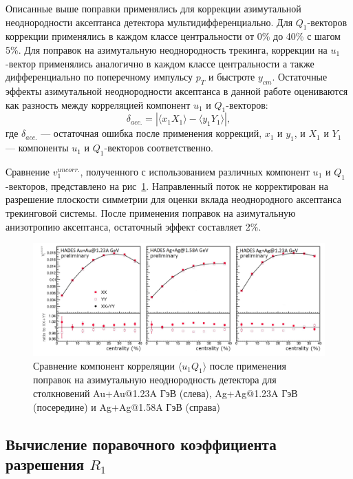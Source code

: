 Описанные выше поправки применялись для коррекции азимутальной неоднородности аксептанса детектора мультидифференциально.
Для $Q_1$-векторов коррекции применялись в каждом классе центральности от 0\% до 40\% с шагом 5\%.
Для поправок на азимутальную неоднородность трекинга, коррекции на $u_1$-вектор применялись аналогично в каждом классе центральности а также дифференциально по поперечному импульсу $p_T$ и быстроте $y_{cm}$. 
Остаточные эффекты азимутальной неоднородности аксептанса в данной работе оцениваются как разность между корреляцией компонент $u_1$ и $Q_1$-векторов:
\begin{equation}
    \delta_{acc.} = | \langle x_1 X_1 \rangle - \langle y_1 Y_1 \rangle |,
\end{equation}
где $\delta_{acc.}$ --- остаточная ошибка после применения коррекций, $x_1$ и $y_1$, и $X_1$ и $Y_1$ --- компоненты $u_1$ и $Q_1$-векторов соответственно. 

Сравнение $v_1^{uncorr.}$, полученного с использованием различных компонент $u_1$ и $Q_1$-векторов, представлено на рис~\ref{fig:hades_uq_corr}. 
Направленный поток не корректирован на разрешение плоскости симметрии для оценки вклада неоднородного аксептанса трекинговой системы. 
После применения поправок на азимутальную анизотропию аксептанса, остаточный эффект составляет 2\%.
%
\begin{figure}[ht]
\begin{center}
\includegraphics[width=0.75\linewidth]{images/hades_u1W1_centrality.png}
\caption{Сравнение компонент корреляции $\langle u_1 Q_1 \rangle$ после применения поправок на азимутальную неоднородность детектора для столкновений Au+Au@1.23A ГэВ (слева), Ag+Ag@1.23A ГэВ (посередине) и Ag+Ag@1.58A ГэВ (справа)}
\label{fig:hades_uq_corr}
\end{center}
\end{figure}
%

\subsection{Вычисление поравочного коэффициента разрешения $R_1$}

